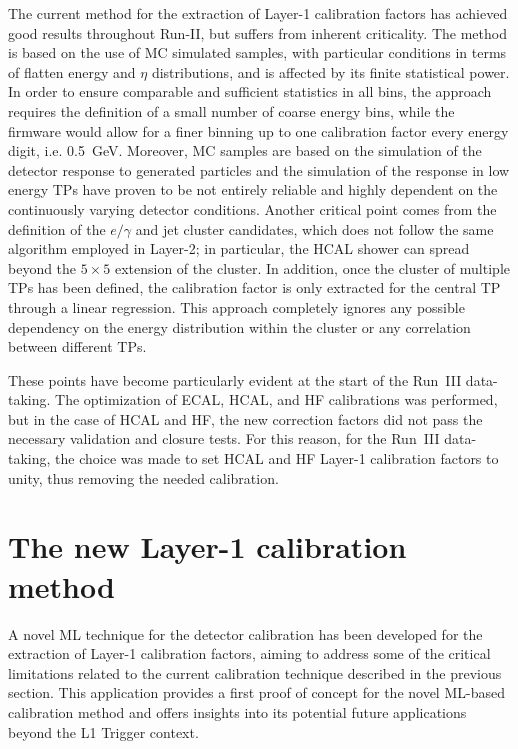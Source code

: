 \bigbreak

The current method for the extraction of Layer-1 calibration factors has achieved good results throughout Run-II, but suffers from inherent criticality. 
The method is based on the use of MC simulated samples, with particular conditions in terms of flatten energy and $\eta$ distributions, and is affected by its finite statistical power. 
In order to ensure comparable and sufficient statistics in all bins, the approach requires the definition of a small number of coarse energy bins, while the firmware would allow for a finer binning up to one calibration factor every energy digit, i.e. 0.5~GeV.
Moreover, MC samples are based on the simulation of the detector response to generated particles and the simulation of the response in low energy TPs have proven to be not entirely reliable and highly dependent on the continuously varying detector conditions.
Another critical point comes from the definition of the $e/\gamma$ and jet cluster candidates, which does not follow the same algorithm employed in Layer-2; in particular, the HCAL shower can spread beyond the $5\times5$ extension of the cluster.
In addition, once the cluster of multiple TPs has been defined, the calibration factor is only extracted for the central TP through a linear regression. This approach completely ignores any possible dependency on the energy distribution within the cluster or any correlation between different TPs.

These points have become particularly evident at the start of the Run~III data-taking. 
The optimization of ECAL, HCAL, and HF calibrations was performed, but in the case of HCAL and HF, the new correction factors did not pass the necessary validation and closure tests. 
For this reason, for the Run~III data-taking, the choice was made to set HCAL and HF Layer-1 calibration factors to unity, thus removing the needed calibration.

\section{The new Layer-1 calibration method}

A novel ML technique for the detector calibration has been developed for the extraction of Layer-1 calibration factors, aiming to address some of the critical limitations related to the current calibration technique described in the previous section.
This application provides a first proof of concept for the novel ML-based calibration method and offers insights into its potential future applications beyond the L1 Trigger context.

